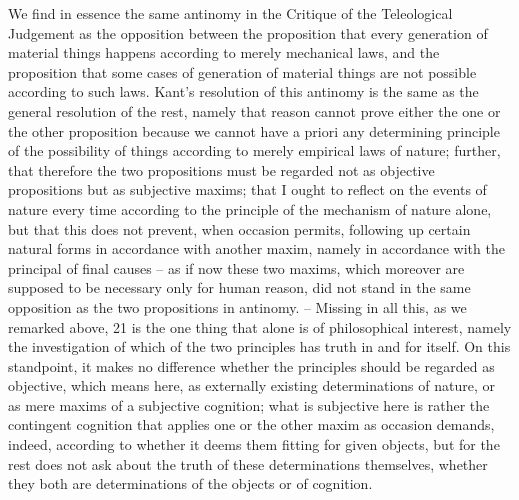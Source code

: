 We find in essence the same antinomy in the Critique of the Teleological
Judgement as the opposition between the proposition that every generation
of material things happens according to merely mechanical laws, and the
proposition that some cases of generation of material things are not possible
according to such laws.
Kant's resolution of this antinomy is the same
as the general resolution of the rest, namely that reason cannot prove
either the one or the other proposition because we cannot have a priori
any determining principle of the possibility of things according to merely
empirical laws of nature; further, that therefore the two propositions must
be regarded not as objective propositions but as subjective maxims; that
I ought to reflect on the events of nature every time according to the
principle of the mechanism of nature alone, but that this does not prevent,
when occasion permits, following up certain natural forms in accordance
with another maxim, namely in accordance with the principal of final
causes – as if now these two maxims, which moreover are supposed to be
necessary only for human reason, did not stand in the same opposition as
the two propositions in antinomy. – Missing in all this, as we remarked
above, 21 is the one thing that alone is of philosophical interest, namely
the investigation of which of the two principles has truth in and for
itself. On this standpoint, it makes no difference whether the principles
should be regarded as objective, which means here, as externally existing
determinations of nature, or as mere maxims of a subjective cognition; what
is subjective here is rather the contingent cognition that applies one or the
other maxim as occasion demands, indeed, according to whether it deems
them fitting for given objects, but for the rest does not ask about the truth
of these determinations themselves, whether they both are determinations
of the objects or of cognition.

